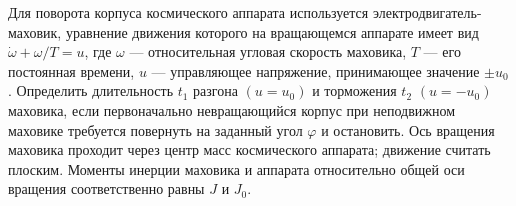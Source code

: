 Для поворота корпуса космического аппарата используется
электродвигатель-маховик, уравнение движения которого на вращающемся аппарате
имеет вид $\dot{\omega} + \omega / T = u$, где $\omega$ --- относительная
угловая скорость маховика, $T$ --- его постоянная времени, $u$ --- управляющее
напряжение, принимающее значение $\pm u_0$.
Определить длительность $t_1$ разгона $(u = u_0)$
и торможения $t_2$ $(u = -u_0)$ маховика, если первоначально невращающийся
корпус при неподвижном маховике требуется повернуть
на заданный угол $\varphi$ и остановить.
Ось вращения маховика проходит через центр масс космического аппарата;
движение считать плоским.
Моменты инерции маховика и аппарата относительно общей оси вращения
соответственно равны $J$ и $J_0$.

